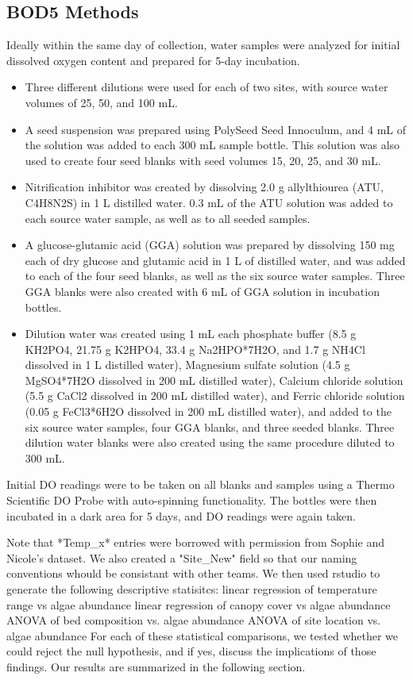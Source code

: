 \documentclass{article}
\begin{document}
\subsection{BOD5 Methods}

Ideally within the same day of collection, water samples were analyzed for initial dissolved oxygen content and prepared for 5-day incubation.  
\begin{itemize}
  \item Three different dilutions were used for each of two sites, with source water volumes of 25, 50, and 100 mL. 
  \item A seed suspension was prepared using PolySeed Seed Innoculum, and 4 mL of the solution was added to each 300 mL sample bottle. This solution was also used to create four seed blanks with seed volumes 15, 20, 25, and 30 mL.
  \item Nitrification inhibitor was created by dissolving 2.0 g allylthiourea (ATU, C4H8N2S) in 1 L distilled water. 0.3 mL of the ATU solution was added to each source water sample, as well as to all seeded samples. 
  \item A glucose-glutamic acid (GGA) solution was prepared by dissolving 150 mg each of dry glucose and glutamic acid in 1 L of distilled water, and was added to each of the four seed blanks, as well as the six source water samples. Three GGA blanks were also created with 6 mL of GGA solution in incubation bottles. 
  \item Dilution water was created using 1 mL each phosphate buffer (8.5 g KH2PO4, 21.75 g K2HPO4, 33.4 g Na2HPO*7H2O, and 1.7 g NH4Cl dissolved in 1 L distilled water), Magnesium sulfate solution (4.5 g MgSO4*7H2O dissolved in 200 mL distilled water), Calcium chloride solution (5.5 g CaCl2 dissolved in 200 mL distilled water), and Ferric chloride solution (0.05 g FeCl3*6H2O dissolved in 200 mL distilled water), and added to the six source water samples, four GGA blanks, and three seeded blanks. Three dilution water blanks were also created using the same procedure diluted to 300 mL.
\end{itemize}
Initial DO readings were to be taken on all blanks and samples using a Thermo Scientific DO Probe with auto-spinning functionality. The bottles were then incubated in a dark area for 5 days, and DO readings were again taken.  

Note that *Temp\_x* entries were borrowed with permission from Sophie and Nicole's dataset. We also created a "Site\_New" field so that our naming conventions whould be consistant with other teams. We then used rstudio to generate the following descriptive statisitcs:  
linear regression of temperature range vs algae abundance
linear regression of canopy cover vs algae abundance
ANOVA of bed composition vs. algae abundance
ANOVA of site location vs. algae abundance
For each of these statistical comparisons, we tested whether we could reject the null hypothesis, and if yes, discuss the implications of those findings. Our results are summarized in the following section. 
\end{document}
